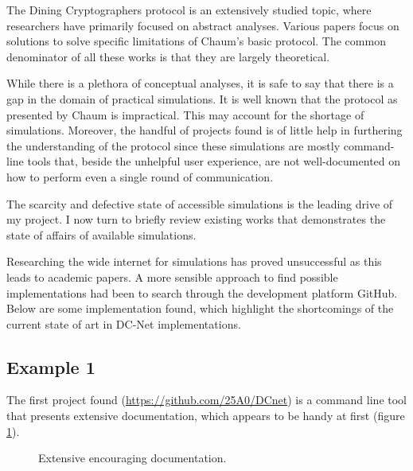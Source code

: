 The Dining Cryptographers protocol is an extensively studied topic, where researchers have primarily focused on abstract analyses. Various papers focus on solutions to solve specific limitations of Chaum's basic protocol. The common denominator of all these works is that they are largely theoretical. 

While there is a plethora of conceptual analyses, it is safe to say that there is a gap in the domain of practical simulations. It is well known that the protocol as presented by Chaum is impractical. This may account for the shortage of simulations. Moreover, the handful of projects found is of little help in furthering the understanding of the protocol since these simulations are mostly command-line tools that, beside the unhelpful user experience, are not well-documented on how to perform even a single round of communication.

The scarcity and defective state of accessible simulations is the leading drive of my project. I now turn to briefly review existing works that demonstrates the state of affairs of available simulations. \newline

Researching the wide internet for simulations has proved unsuccessful as this leads to academic papers. A more sensible approach to find possible implementations had been to search through the development platform GitHub. Below are some implementation found, which highlight the shortcomings of the current state of art in DC-Net implementations.

\subsection{Example 1}
The first project found (\url{https://github.com/25A0/DCnet}) is a command line tool that presents extensive documentation, which appears to be handy at first (figure \ref{fig:work1documentation}).

\begin{figure}[H]
    \centering
    \caption{Extensive encouraging documentation.}
    \label{fig:work1documentation}
\end{figure}

